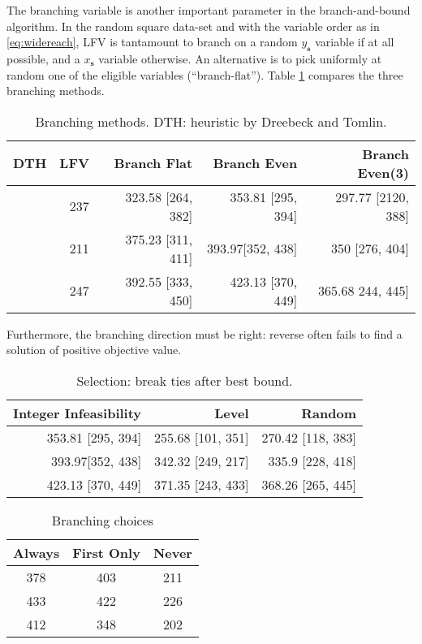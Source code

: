 \documentclass[11pt]{article}
\theoremstyle{definition}
\newcommand{\vect}[1]{\mathbf{#1}}
\newcommand{\sv}[1]{_{\vect{#1}}}
\begin{document}
The branching variable is another important parameter in 
the branch-and-bound algorithm. 
In the random square data-set and with the variable order
as in \eqref{eq:widereach}, LFV is tantamount to branch on 
a random $y\sv{s}$ variable if at all possible, and a 
$x\sv{s}$ variable otherwise.
An alternative is to pick uniformly at random one of the eligible
variables (``branch-flat'').
Table \ref{tab:ibranch} compares the three branching methods.
\begin{table}
\centering
\begin{tabular}{|r|r|r|r|r|} \hline
{\bf DTH\/} & {\bf LFV\/} & {\bf Branch Flat\/} & {\bf Branch Even\/} & 
{\bf Branch Even(3)\/}\\ \hline\hline
[-837495, 350] & 237 &  323.58 [264, 382] & 353.81 [295, 394]
 & 297.77 [2120, 388] \\ \hline
[-898551, 335] & 211 & 375.23 [311, 411] & 393.97[352, 438] & 350 [276, 404] \\ \hline
[-790446, -153] & 247 & 392.55 [333, 450] & 423.13 [370, 449] & 365.68 244, 445] \\ \hline
\end{tabular}
\caption{Branching methods. DTH: heuristic by Dreebeck and Tomlin.}
\label{tab:ibranch}
\end{table}
Furthermore, the branching direction must be right: reverse often 
fails to find a solution of positive objective value.
\begin{table}
\centering
\begin{tabular}{|r|r|r|} \hline
{\bf Integer Infeasibility\/} & {\bf Level\/} & {\bf Random\/} \\ \hline\hline
353.81 [295, 394] & 255.68 [101, 351] & 270.42 [118, 383] \\ \hline
393.97[352, 438] & 342.32 [249, 217] & 335.9 [228, 418] \\ \hline
423.13 [370, 449] & 371.35 [243, 433] & 368.26 [265, 445]\\ \hline
\end{tabular}
\caption{Selection: break ties after best bound.}
\label{tab:selection}
\end{table}



\begin{table}
\centering
\begin{tabular}{|c|c|c|} \hline
Always &  First Only & Never\\ \hline\hline
378 & 403 & 211 \\ \hline
433 & 422 & 226 \\ \hline
412 & 348 & 202  \\ \hline
\end{tabular}
\caption{Branching choices}
\label{tab:branching}
\end{table}
\fi



\end{document}
